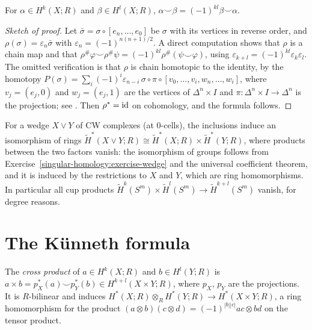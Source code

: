 \begin{theorem}\label{singular-cohomology:theorem-graded-commutative}
For $\alpha \in H^k(X; R)$ and $\beta \in H^l(X; R)$, $\alpha \smile \beta = (-1)^{kl}\beta \smile \alpha$.
\end{theorem}

\begin{proof}[Sketch of proof]
Let $\bar\sigma = \sigma \circ [e_n, \ldots, e_0]$ be $\sigma$ with its vertices in reverse order, and $\rho(\sigma) = \varepsilon_n\bar\sigma$ with $\varepsilon_n = (-1)^{n(n+1)/2}$.
A direct computation shows that $\rho$ is a chain map and that
$\rho^\#\varphi \smile \rho^\#\psi = (-1)^{kl}\rho^\#(\psi \smile \varphi)$, using $\varepsilon_{k+l} = (-1)^{kl}\varepsilon_k\varepsilon_l$. The omitted verification is that $\rho$ is
chain homotopic to the identity, by the homotopy $P(\sigma) = \sum_i (-1)^i\varepsilon_{n-i}\,\sigma \circ \pi \circ [v_0, \ldots, v_i, w_n, \ldots, w_i]$, where
$v_j = (e_j, 0)$ and $w_j = (e_j, 1)$ are the vertices of $\Delta^n \times I$ and $\pi \colon \Delta^n \times I \to \Delta^n$ is the projection; see
\cite[Theorem 3.14]{hatcher-at}. Then $\rho^* = \mathrm{id}$ on cohomology, and the formula follows.
\end{proof}

\begin{example}\label{singular-cohomology:example-wedge-ring}
For a wedge $X \vee Y$ of CW complexes (at $0$-cells), the inclusions induce an isomorphism of rings
$\tilde{H}^*(X \vee Y; R) \cong \tilde{H}^*(X; R) \times \tilde{H}^*(Y; R)$, where products between the two factors vanish: the isomorphism of groups follows from
Exercise~\ref{singular-homology:exercise-wedge} and the universal coefficient theorem, and it is induced by the restrictions to $X$ and $Y$, which are ring homomorphisms.
In particular all cup products $\tilde{H}^k(S^m) \times \tilde{H}^l(S^m) \to \tilde{H}^{k+l}(S^m)$ vanish, for degree reasons.
\end{example}

\section{The K\"unneth formula}\label{singular-cohomology:section-kunneth}

\begin{definition}\label{singular-cohomology:definition-cross-product}
The \emph{cross product} of $a \in H^k(X; R)$ and $b \in H^l(Y; R)$ is $a \times b = p_X^*(a) \smile p_Y^*(b) \in H^{k+l}(X \times Y; R)$, where $p_X$, $p_Y$ are the
projections. It is $R$-bilinear and induces $H^*(X; R) \otimes_R H^*(Y; R) \to H^*(X \times Y; R)$, a ring homomorphism for the product
$(a \otimes b)(c \otimes d) = (-1)^{|b||c|}ac \otimes bd$ on the tensor product.
\end{definition}

